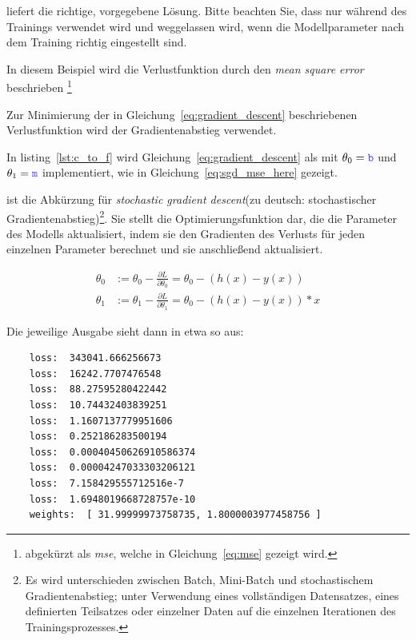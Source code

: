  liefert die richtige, vorgegebene Lösung.
Bitte beachten Sie, dass  nur während des Trainings verwendet wird und weggelassen wird, wenn die Modellparameter nach dem Training richtig eingestellt sind.

In diesem Beispiel wird die Verlustfunktion durch den \textit{mean square error } beschrieben \footnote{ abgekürzt als \textit{mse}, welche in Gleichung~\eqref{eq:mse} gezeigt wird.}

Zur Minimierung der in Gleichung~\eqref{eq:gradient_descent} beschriebenen Verlustfunktion wird der Gradientenabstieg verwendet.

In listing~\ref{lst:c_to_f} wird Gleichung~\eqref{eq:gradient_descent} als  mit $\theta_0 = \code{b}$ und $\theta_1= \code{m}$ implementiert, wie in Gleichung~\eqref{eq:sgd_mse_here} gezeigt.

 ist die Abkürzung für \textit{stochastic gradient descent}(zu deutsch: stochastischer Gradientenabstieg)\footnote{Es wird unterschieden zwischen Batch, Mini-Batch und stochastischem Gradientenabstieg; unter Verwendung eines vollständigen Datensatzes, eines definierten Teilsatzes oder einzelner Daten auf die einzelnen Iterationen des Trainingsprozesses.}.
Sie stellt die Optimierungsfunktion dar, die die Parameter des Modells aktualisiert, indem sie den Gradienten des Verlusts für jeden einzelnen Parameter berechnet und sie anschließend aktualisiert.

\begin{equation}
    \begin{split}
        \theta_{0} & := \theta_{0} - \frac{\partial L}{\partial \theta_{0}} =
        \theta_{0} - (h(x) - y(x))  \\
        \theta_{1} & := \theta_{1} - \frac{\partial L}{\partial \theta_{1}} =
        \theta_{0} - (h(x) - y(x)) * x
    \end{split}
    \label{eq:sgd_mse_here}
\end{equation}

Die jeweilige Ausgabe sieht dann in etwa so aus:
\begin{lstlisting}
    loss:  343041.666256673
    loss:  16242.7707476548
    loss:  88.27595280422442
    loss:  10.74432403839251
    loss:  1.1607137779951606
    loss:  0.252186283500194
    loss:  0.00040450626910586374
    loss:  0.00004247033303206121
    loss:  7.158429555712516e-7
    loss:  1.6948019668728757e-10
    weights:  [ 31.99999973758735, 1.8000003977458756 ]
\end{lstlisting}

